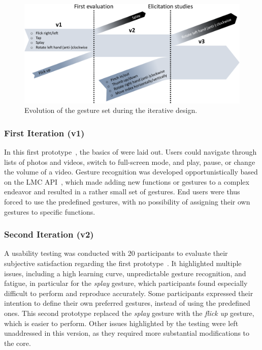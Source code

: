 \begin{figure}[htb]
    \centering
    \includegraphics[width=\linewidth]{Figures/LUI/Overview/gesture-set-evolution.pdf}
    \vspace{-8pt}
    \caption{Evolution of the gesture set during the iterative design.}
    \label{fig:lui:gesture-set-evolution}
\end{figure}

\subsubsection{First Iteration (v1)}
In this first prototype~\cite{Parthiban:2019}, the basics of \lui were laid out. Users could navigate through lists of photos and videos, switch to full-screen mode, and play, pause, or change the volume of a video. Gesture recognition was developed opportunistically based on the LMC API~\cite{Spiegelmock:2013}, which made adding new functions or gestures to \lui a complex endeavor and resulted in a rather small set of gestures. End users were thus forced to use the predefined gestures, with no possibility of assigning their own gestures to specific functions.

\subsubsection{Second Iteration (v2)}
A usability testing was conducted with 20 participants to evaluate their subjective satisfaction regarding the first prototype~\cite{Parthiban:2019,Dumas:2019}. It highlighted multiple issues, including a high learning curve, unpredictable gesture recognition, and fatigue, in particular for the \textit{splay} gesture, which participants found especially difficult to perform and reproduce accurately. 
Some participants expressed their intention to define their own preferred gestures, instead of using the predefined ones.
This second prototype replaced the \textit{splay} gesture with the \textit{flick up} gesture, which is easier to perform. Other issues highlighted by the testing were left unaddressed in this version, as they required more substantial modifications to the \lui core.

